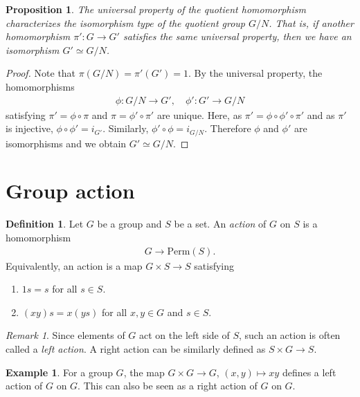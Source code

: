 \documentclass[12pt]{report}
\theoremstyle{plain}
\newtheorem{proposition}[theorem]{Proposition}
\theoremstyle{remark}
\newtheorem*{remark}{Remark}
\theoremstyle{definition}
\newtheorem{definition}[theorem]{Definition}
\newtheorem{example}[theorem]{Example}
\begin{document}
\begin{proposition}
    The universal property of the quotient homomorphism characterizes the isomorphism type of the quotient group $G/N$. That is, if another homomorphism $\pi':G\rightarrow G'$ satisfies the same universal property, then we have an isomorphism $G'\simeq G/N$.
\end{proposition}
\begin{proof}
    Note that $\pi(G/N) = \pi'(G')=1$. By the universal property, the homomorphisms
    \begin{align*}
        \phi:G/N\rightarrow G',\quad \phi':G'\rightarrow G/N
    \end{align*}
    satisfying $\pi'=\phi\circ\pi$ and $\pi=\phi'\circ\pi'$ are unique. Here, as $\pi'=\phi\circ\phi'\circ \pi'$ and as $\pi'$ is injective, $\phi\circ\phi'=i_{G'}$. Similarly, $\phi'\circ\phi = i_{G/N}$. Therefore $\phi$ and $\phi'$ are isomorphisms and we obtain $G'\simeq G/N$.
\end{proof}


\section{Group action}
\begin{definition}
    Let $G$ be a group and $S$ be a set. An \emph{action} of $G$ on $S$ is a homomorphism
    \begin{align*}
        G\rightarrow\mathrm{Perm}(S).
    \end{align*}
    Equivalently, an action is a map $G\times S\rightarrow S$ satisfying
    \begin{enumerate}
        \item $1s=s$ for all $s\in S$.
        \item $(xy)s=x(ys)$ for all $x,y\in G$ and $s\in S$. 
    \end{enumerate}
\end{definition}
\begin{remark}
    Since elements of $G$ act on the left side of $S$, such an action is often called a \emph{left action}. A right action can be similarly defined as $S\times G\rightarrow S$.
\end{remark}

\begin{example}
    For a group $G$, the map $G\times G\rightarrow G$, $(x,y)\mapsto xy$ defines a left action of $G$ on $G$. This can also be seen as a right action of $G$ on $G$.
\end{example}
\end{document}
